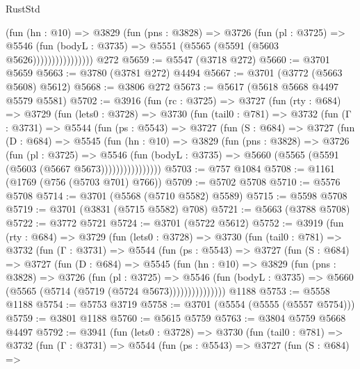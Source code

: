 \begin{lexlean}{RustStd}
\begin{coremodule}
{\begin{coremodule}
{{{{{{{{{{{{{{                      (fun (hn : @10) =>
                      @3829
                        (fun (pns : @3828) =>
                        @3726
                          (fun (pl : @3725) =>
                          @5546
                            (fun (bodyL : @3735) => @5551 (@5565 (@5591 (@5603 @5626))))))))))))))))
    @272
@5659 := @5547 (@3718 @272)
@5660 := @3701 @5659
@5663 := @3780 (@3781 @272) @4494
@5667 := @3701 (@3772 (@5663 @5608) @5612)
@5668 := @3806 @272
@5673 := @5617 (@5618 @5668 @4497 @5579 @5581)
@5702 := @3916
    (fun (rc : @3725) =>
    @3727
      (fun (rty : @684) =>
      @3729
        (fun (lets0 : @3728) =>
        @3730
          (fun (tail0 : @781) =>
          @3732
            (fun (Γ : @3731) =>
            @5544
              (fun (ps : @5543) =>
              @3727
                (fun (S : @684) =>
                @3727
                  (fun (D : @684) =>
                  @5545
                    (fun (hn : @10) =>
                    @3829
                      (fun (pns : @3828) =>
                      @3726
                        (fun (pl : @3725) =>
                        @5546
                          (fun (bodyL : @3735) =>
                          @5660 (@5565 (@5591 (@5603 (@5667 @5673))))))))))))))))
@5703 := @757 @1084
@5708 := @1161 (@1769 (@756 (@5703 @701) @766))
@5709 := @5702 @5708
@5710 := @5576 @5708
@5714 := @3701 (@5568 (@5710 @5582) @5589)
@5715 := @5598 @5708
@5719 := @3701 (@3831 (@5715 @5582) @708)
@5721 := @5663 (@3788 @5708)
@5722 := @3772 @5721
@5724 := @3701 (@5722 @5612)
@5752 := @3919
    (fun (rty : @684) =>
    @3729
      (fun (lets0 : @3728) =>
      @3730
        (fun (tail0 : @781) =>
        @3732
          (fun (Γ : @3731) =>
          @5544
            (fun (ps : @5543) =>
            @3727
              (fun (S : @684) =>
              @3727
                (fun (D : @684) =>
                @5545
                  (fun (hn : @10) =>
                  @3829
                    (fun (pns : @3828) =>
                    @3726
                      (fun (pl : @3725) =>
                      @5546
                        (fun (bodyL : @3735) =>
                        @5660 (@5565 (@5714 (@5719 (@5724 @5673)))))))))))))))
    @1188
@5753 := @5558 @1188
@5754 := @5753 @3719
@5758 := @3701 (@5554 (@5555 (@5557 @5754)))
@5759 := @3801 @1188
@5760 := @5615 @5759
@5763 := @3804 @5759 @5668 @4497
@5792 := @3941
    (fun (lets0 : @3728) =>
    @3730
      (fun (tail0 : @781) =>
      @3732
        (fun (Γ : @3731) =>
        @5544
          (fun (ps : @5543) =>
          @3727
            (fun (S : @684) =>
}}}}}}}}}}}}}}
\end{coremodule}}
\end{coremodule}
\end{lexlean}
